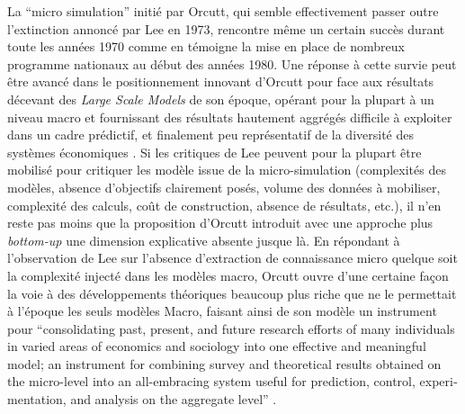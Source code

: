 La \enquote{micro simulation} initié par Orcutt, qui semble effectivement passer outre l'extinction annoncé par Lee en 1973, rencontre même un certain succès durant toute les années 1970 comme en témoigne la mise en place de nombreux programme nationaux au début des années 1980. \autocite{Baroni2007} Une réponse à cette survie peut être avancé dans le positionnement innovant d'Orcutt pour face aux résultats décevant des \textit{Large Scale Models} de son époque, opérant pour la plupart à un niveau macro et fournissant des résultats hautement aggrégés difficile à exploiter dans un cadre prédictif, et finalement peu représentatif de la diversité des systèmes économiques \autocite{Birkin2012} \autocite{Baroni2007}. Si les critiques de Lee peuvent pour la plupart être mobilisé pour critiquer les modèle issue de la micro-simulation (complexités des modèles, absence d'objectifs clairement posés, volume des données à mobiliser, complexité des calculs, coût de construction, absence de résultats, etc.), il n'en reste pas moins que la proposition d'Orcutt introduit avec une approche plus \textit{bottom-up} une dimension explicative absente jusque là. En répondant à l'observation de Lee sur l'absence d'extraction de connaissance micro quelque soit la complexité injecté dans les modèles macro, Orcutt ouvre d'une certaine façon la voie à des développements théoriques beaucoup plus riche que ne le permettait à l'époque les seuls modèles Macro, faisant ainsi de son modèle un instrument pour \foreignquote{english}{consolidating past, present, and future research efforts of many individuals in varied areas of economics and sociology into one effective and meaningful model; an instrument for combining survey and theoretical results obtained on the micro-level into an all-embracing system useful for prediction, control, experimentation, and analysis on the aggregate level} \autocite[122]{Cohen1961}.

